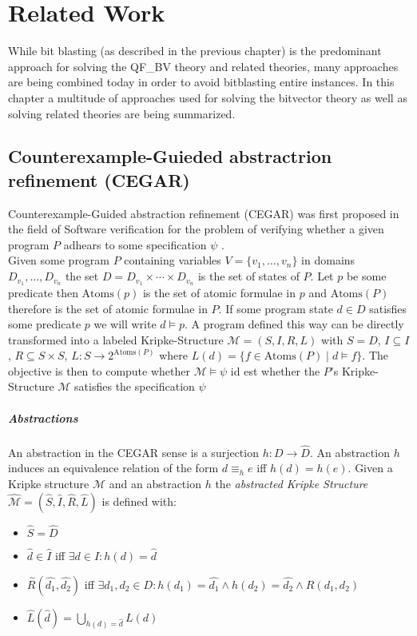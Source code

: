 \chapter{Related Work}
\label{ch:related_work}
While bit blasting (as described in the previous chapter) is the predominant approach for solving the QF\_BV theory and related theories, many approaches are being combined today in order to avoid bitblasting entire instances.
In this chapter a multitude of approaches used for solving the bitvector theory as well as solving related theories are being summarized. 

\section{Counterexample-Guieded abstractrion refinement (CEGAR)}
Counterexample-Guided abstraction refinement (CEGAR) was first proposed in the field of Software verification for the problem of verifying whether a given program $P$ adhears to some specification $\psi$ \cite{CEGAR}.\\
Given some program $P$ containing variables $V=\{v_1,\dots,v_n\}$ in domains $D_{v_1},\dots,D_{v_n}$ the set $D=D_{v_1}\times\dotsi\times D_{v_n}$ is the set of states of $P$. Let $p$ be some predicate then $\text{Atoms}\left(p\right)$ is the set of atomic formulae in $p$ and $\text{Atoms}\left(P\right)$ therefore is the set of atomic formulae in $P$. If some program state $d\in D$ satisfies some predicate $p$ we will write $d\vDash p$. A program defined this way can be directly transformed into a labeled Kripke-Structure $\mathcal{M}=\left(S,I,R,L\right)$ with $S=D$, $I\subseteq I$, $R \subseteq S \times S$, $L\colon S \to 2^{\text{Atoms}\left(P\right)}$ where $L\left(d\right) = \{ f \in \text{Atoms}\left(P\right) \mid d \vDash f \}$. The objective is then to compute whether $\mathcal{M}\vDash\psi$ id est whether the $P$'s Kripke-Structure $\mathcal{M}$ satisfies the specification $\psi$
\paragraph{Abstractions}
An abstraction in the CEGAR sense is a surjection $h\colon D \to \hat{D}$. An abstraction $h$ induces an equivalence relation of the form $d \equiv_h e$ iff $h\left(d\right) = h\left(e\right)$. Given a Kripke structure $\mathcal{M}$ and an abstraction $h$ the \textit{abstracted Kripke Structure} $\hat{\mathcal{M}} = \left(\hat{S},\hat{I},\hat{R},\hat{L}\right)$ is defined with:
\begin{itemize}
    \item $\hat{S} = \hat{D}$
    \item $\hat{d} \in \hat{I}$ iff $\exists d \in I\colon h\left(d\right) = \hat{d}$
    \item $\hat{R}\left(\hat{d_1},\hat{d_2}\right)$ iff $\exists d_1,d_2 \in D\colon h\left(d_1\right) = \hat{d_1} \land h\left(d_2\right) = \hat{d_2} \land R\left(d_1, d_2\right)$
    \item $\hat{L}\left(\hat{d}\right)=\bigcup\limits_{h\left(d\right)=\hat{d}} L\left(d\right)$
\end{itemize}


